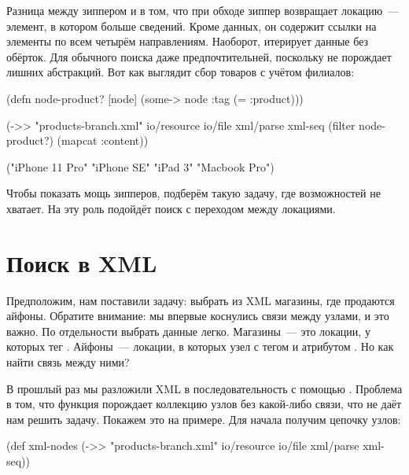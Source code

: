 Разница между зиппером и  в том, что при обходе зиппер возвращает
локацию~--- элемент, в котором больше сведений. Кроме данных, он содержит ссылки
на элементы по всем четырём направлениям. Наоборот,  итерирует
данные без обёрток. Для обычного поиска  даже предпочтительней,
поскольку не порождает лишних абстракций. Вот как выглядит сбор товаров с учётом
филиалов:

\pagebreaklarge

\begin{english}
  \begin{clojure}
(defn node-product? [node]
  (some-> node :tag (= :product)))

(->> "products-branch.xml"
     io/resource
     io/file
     xml/parse
     xml-seq
     (filter node-product?)
     (mapcat :content))

("iPhone 11 Pro" "iPhone SE" "iPad 3" "Macbook Pro")
  \end{clojure}
\end{english}

Чтобы показать мощь зипперов, подберём такую задачу, где возможностей 
не хватает. На эту роль подойдёт поиск с переходом между локациями.

\section{Поиск в XML}


Предположим, нам поставили задачу: выбрать из XML магазины, где продаются
айфоны. Обратите внимание: мы впервые коснулись связи между узлами, и это
важно. По отдельности выбрать данные легко. Магазины~--- это локации, у которых
тег . Айфоны~--- локации, в которых узел с тегом  и
атрибутом . Но как найти связь между ними?

В прошлый раз мы разложили XML в последовательность с помощью
. Проблема в том, что функция порождает коллекцию узлов без какой-либо
связи, что не даёт нам решить задачу. Покажем это на примере. Для начала получим
цепочку узлов:

\begin{english}
  \begin{clojure}
(def xml-nodes
  (->> "products-branch.xml"
       io/resource
       io/file
       xml/parse
       xml-seq))
  \end{clojure}
\end{english}

